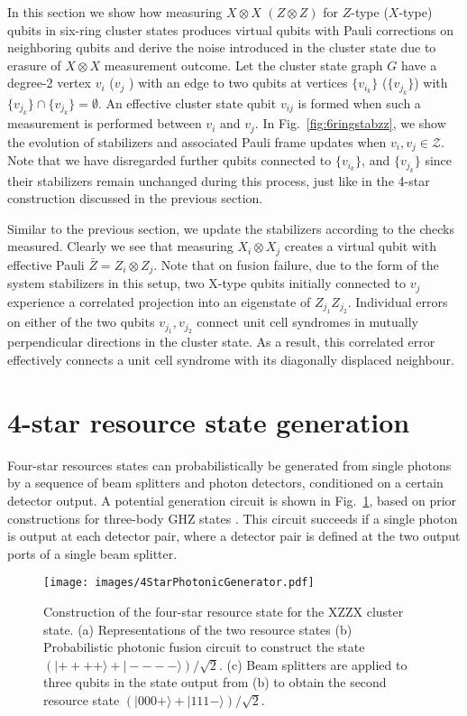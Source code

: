 \documentclass[reprint,
groupedaddress,
 prl,amsmath,amssymb,
 aps]{revtex4-2}
\theoremstyle{definition}
\begin{document}
\begin{bibunit}
In this section we show how measuring $X\otimes X$ $(Z\otimes Z)$ for $Z$-type ($X$-type) qubits in six-ring cluster states produces virtual qubits with Pauli corrections on neighboring qubits and derive the noise introduced in the cluster state due to erasure of $X\otimes X$ measurement outcome. Let the cluster state graph $G$ have a degree-2 vertex $v_i$ ($v_j$ ) with an edge to two qubits at vertices $\{v_{i_k}\}$ {($\{v_{j_k}\}$) with $\{v_{j_k}\}\cap\{v_{j_k}\}=\emptyset$}. An effective cluster state qubit $v_{ij}$ is formed when such a measurement is performed between $v_i$ and $v_j$. In Fig.~\ref{fig:6ringstabzz}, we show the evolution of stabilizers and associated Pauli frame updates when $v_{i}, v_{j}\in\mathcal{Z}$. Note that we have disregarded further qubits connected to $\{v_{i_k}\}$, and $\{v_{j_k}\}$ since their stabilizers remain unchanged during this process, just like in the 4-star construction discussed in the previous section.

Similar to the previous section,  we update the stabilizers according to the checks measured. Clearly we see that measuring $X_i\otimes X_j$ creates a virtual qubit with effective Pauli $\bar Z=Z_i\otimes Z_j$. 
Note that on fusion failure, due to the form of the system stabilizers in this setup, two X-type qubits initially connected to $v_j$ experience a correlated projection into an eigenstate of $Z_{j_1} Z_{j_2}$. Individual errors on either of the two qubits $v_{j_1}, v_{j_2}$ connect unit cell syndromes in mutually perpendicular directions in the cluster state. As a result, this correlated error effectively connects a unit cell syndrome with its diagonally displaced neighbour. 


\section{4-star resource state generation}
Four-star resources states can probabilistically be generated from single photons by a sequence of beam splitters and photon detectors, conditioned on a certain detector output. A potential generation circuit is shown in Fig.~\ref{fig:4starcircuit}, based on prior constructions for three-body GHZ states \cite{varnava2008good, li2015resource}. This circuit succeeds if a single photon is output at each detector pair, where a detector pair is defined at the two output ports of a single beam splitter.
\begin{figure}[ht]
    \centering
\texttt{[image: images/4StarPhotonicGenerator.pdf]}
    \caption{Construction of the four-star resource state for the XZZX cluster state. (a) Representations of the two resource states (b) Probabilistic photonic fusion circuit to construct the state  $\left(|++++\rangle + |----\rangle \right)/ \sqrt{2}$. (c) Beam splitters are applied to three qubits in the state output from (b) to obtain the second resource state $\left(|000+\rangle + |111-\rangle \right)/ \sqrt{2}$.}
    \label{fig:4starcircuit}
\end{figure}


\end{bibunit}
\end{document}
